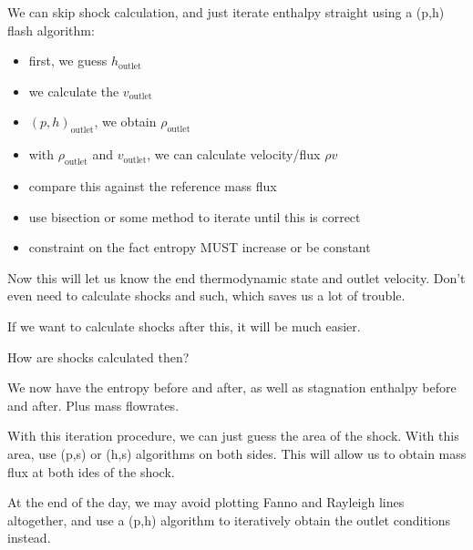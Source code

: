 \documentclass[masters]{ucbthesis}
\renewcommand{\_}{\kern-1.5pt\textunderscore\kern-1.5pt}
\begin{document}
We can skip shock calculation, and just iterate enthalpy straight using a 
(p,h) flash algorithm:

\begin{itemize}
	\item first, we guess $h_\text{outlet}$
	\item we calculate the $v_\text{outlet}$
	\item $(p,h)_\text{outlet}$, we obtain $\rho_\text{outlet}$
	\item with $\rho_\text{outlet}$ and $v_\text{outlet}$, we can calculate 
		velocity/flux $\rho v$
	\item compare this against the reference mass flux
	\item use bisection or some method to iterate until this is correct 
	\item constraint on the fact entropy MUST increase or be constant
\end{itemize}

Now this will let us know the end thermodynamic state and outlet velocity.
Don't even need to calculate shocks and such, which saves us a lot of 
trouble.

If we want to calculate shocks after this, it will be much easier.

How are shocks calculated then?

We now have the entropy before and after, as well as stagnation enthalpy 
before and after. Plus mass flowrates.

With this iteration procedure, we can just guess the area of the shock.
With this area, use (p,s) or (h,s) algorithms on both sides. This will 
allow us to obtain mass flux at both ides of the shock.

At the end of the day, we may avoid plotting Fanno and Rayleigh lines 
altogether, and use a (p,h) algorithm to iteratively obtain the outlet 
conditions instead.
\end{document}
